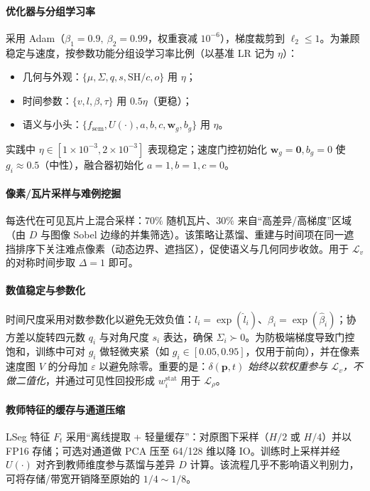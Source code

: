 \documentclass[10pt,conference]{IEEEtran} %
\begin{document}
\paragraph{优化器与分组学习率}
采用 Adam（$\beta_1{=}0.9,\ \beta_2{=}0.99$，权重衰减 $10^{-6}$），梯度裁剪到 $\ell_2\!\le\!1$。为兼顾稳定与速度，按参数功能分组设学习率比例（以基准 LR 记为 $\eta$）：
\begin{itemize}
\item 几何与外观：$\{\mu,\Sigma,q,s,\mathrm{SH}/c,o\}$ 用 $\eta$；
\item 时间参数：$\{v,l,\beta,\tau\}$ 用 $0.5\eta$（更稳）；
\item 语义与小头：$\{f_{\mathrm{sem}},U(\cdot),a,b,c,\mathbf w_g,b_g\}$ 用 $\eta$。
\end{itemize}
实践中 $\eta\!\in[1\!\times\!10^{-3},2\!\times\!10^{-3}]$ 表现稳定；速度门控初始化 $\mathbf w_g{=}\mathbf 0,b_g{=}0$ 使 $g_i\!\approx\!0.5$（中性），融合器初始化 $a{=}1,b{=}1,c{=}0$。

\paragraph{像素/瓦片采样与难例挖掘}
每迭代在可见瓦片上混合采样：$70\%$ 随机瓦片、$30\%$ 来自“高差异/高梯度”区域（由 $D$ 与图像 Sobel 边缘的并集筛选）。该策略让蒸馏、重建与时间项在同一遮挡排序下关注难点像素（动态边界、遮挡区），促使语义与几何同步收敛。用于 $\mathcal L_v$ 的对称时间步取 $\Delta{=}1$ 即可。

\paragraph{数值稳定与参数化}
时间尺度采用对数参数化以避免无效负值：$l_i{=}\exp(\hat l_i)$、$\beta_i{=}\exp(\hat\beta_i)$；协方差以旋转四元数 $q_i$ 与对角尺度 $s_i$ 表达，确保 $\Sigma_i\!\succ\!0$。为防极端梯度导致门控饱和，训练中可对 $g_i$ 做轻微夹紧（如 $g_i\!\in[0.05,0.95]$，仅用于前向），并在像素速度图 $V$ 的分母加 $\varepsilon$ 以避免除零。重要的是：\emph{$\delta(\mathbf p,t)$ 始终以软权重参与 $\mathcal L_v$，不做二值化}，并通过可见性回投形成 $w_i^{\mathrm{stat}}$ 用于 $\mathcal L_\rho$。

\paragraph{教师特征的缓存与通道压缩}
LSeg 特征 $F_t$ 采用“离线提取 + 轻量缓存”：对原图下采样（$H/2$ 或 $H/4$）并以 FP16 存储；可选对通道做 PCA 压至 64/128 维以降 IO。训练时上采样并经 $U(\cdot)$ 对齐到教师维度参与蒸馏与差异 $D$ 计算。该流程几乎不影响语义判别力，可将存储/带宽开销降至原始的 $1/4{\sim}1/8$。
\end{document}
